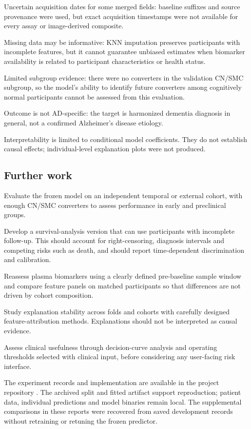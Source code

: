 \documentclass[11pt,a4paper]{article}
\begin{document}
Uncertain acquisition dates for some merged fields: baseline suffixes and source provenance were used, but exact acquisition timestamps were not available for every assay or image-derived composite.

Missing data may be informative: KNN imputation preserves participants with incomplete features, but it cannot guarantee unbiased estimates when biomarker availability is related to participant characteristics or health status.

Limited subgroup evidence: there were no converters in the validation CN/SMC subgroup, so the model's ability to identify future converters among cognitively normal participants cannot be assessed from this evaluation.

Outcome is not AD-specific: the target is harmonized dementia diagnosis in general, not a confirmed Alzheimer's disease etiology.

Interpretability is limited to conditional model coefficients. They do not establish causal effects; individual-level explanation plots were not produced.

\subsection{Further work}
Evaluate the frozen model on an independent temporal or external cohort, with enough CN/SMC converters to assess performance in early and preclinical groups.

Develop a survival-analysis version that can use participants with incomplete follow-up. This should account for right-censoring, diagnosis intervals and competing risks such as death, and should report time-dependent discrimination and calibration.

Reassess plasma biomarkers using a clearly defined pre-baseline sample window and compare feature panels on matched participants so that differences are not driven by cohort composition.

Study explanation stability across folds and cohorts with carefully designed feature-attribution methods. Explanations should not be interpreted as causal evidence.

Assess clinical usefulness through decision-curve analysis and operating thresholds selected with clinical input, before considering any user-facing risk interface.

The experiment records and implementation are available in the project repository \cite{project}. The archived split and fitted artifact support reproduction; patient data, individual predictions and model binaries remain local. The supplemental comparisons in these reports were recovered from saved development records without retraining or retuning the frozen predictor.
\end{document}

